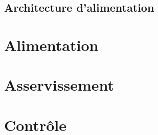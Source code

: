 \documentclass[a4paper,10pt]{refart}
\begin{document}
\subsection{Architecture d'alimentation}


\section{Alimentation}

\section{Asservissement}

\section{Contrôle}

\end{document}
